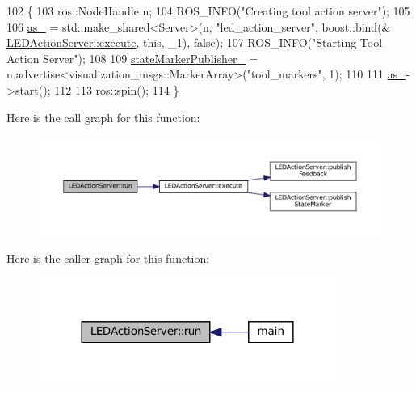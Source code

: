 \begin{DoxyCode}
102 \{
103   ros::NodeHandle n;
104   ROS\_INFO(\textcolor{stringliteral}{"Creating tool action server"});
105 
106   \hyperlink{classLEDActionServer_a61d21c77642081acf017d4ebd65b2de0}{as\_} = std::make\_shared<Server>(n, \textcolor{stringliteral}{"led\_action\_server"}, boost::bind(&
      \hyperlink{classLEDActionServer_a2d8b9dfca1912e24170ef69a5edf5e9b}{LEDActionServer::execute}, \textcolor{keyword}{this},  \_1), \textcolor{keyword}{false});
107   ROS\_INFO(\textcolor{stringliteral}{"Starting Tool Action Server"});
108 
109   \hyperlink{classLEDActionServer_a4168a1e4a17eb1d65aaa059ce0c52086}{stateMarkerPublisher\_} = n.advertise<visualization\_msgs::MarkerArray>(\textcolor{stringliteral}{"tool\_markers"},
       1); 
110 
111   \hyperlink{classLEDActionServer_a61d21c77642081acf017d4ebd65b2de0}{as\_}->start();
112 
113   ros::spin();
114 \}
\end{DoxyCode}
Here is the call graph for this function\+:
\nopagebreak
\begin{figure}[H]
\begin{center}
\leavevmode
\includegraphics[width=350pt]{classLEDActionServer_ae8e1b2d4bf0a85eec3ffd1c7d4f08490_cgraph}
\end{center}
\end{figure}
Here is the caller graph for this function\+:
\nopagebreak
\begin{figure}[H]
\begin{center}
\leavevmode
\includegraphics[width=276pt]{classLEDActionServer_ae8e1b2d4bf0a85eec3ffd1c7d4f08490_icgraph}
\end{center}
\end{figure}
\mbox{\label{classLEDActionServer_ae8e1b2d4bf0a85eec3ffd1c7d4f08490}} 
